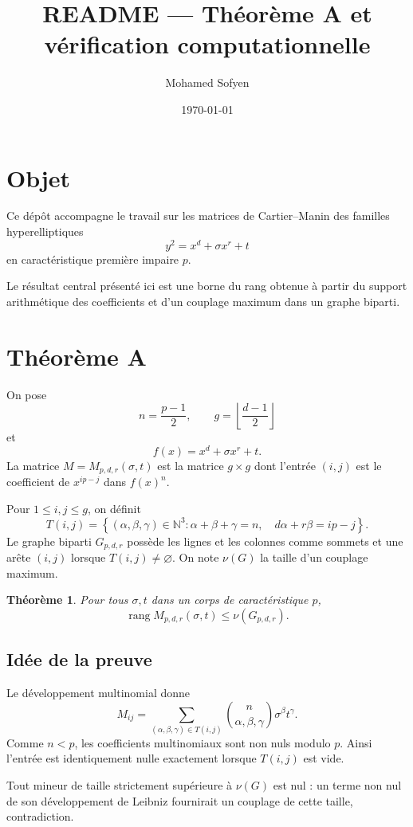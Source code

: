 \documentclass[11pt,a4paper]{article}
\title{README --- Théorème A et vérification computationnelle}
\author{Mohamed Sofyen}
\date{\today}
\newtheorem{theorem}{Théorème}
\begin{document}
\maketitle

\section{Objet}

Ce dépôt accompagne le travail sur les matrices de Cartier--Manin des
familles hyperelliptiques
\[
 y^2=x^d+\sigma x^r+t
\]
en caractéristique première impaire $p$.

Le résultat central présenté ici est une borne du rang obtenue à partir
du support arithmétique des coefficients et d'un couplage maximum dans
un graphe biparti.

\section{Théorème A}

On pose
\[
 n=\frac{p-1}{2},\qquad
 g=\left\lfloor\frac{d-1}{2}\right\rfloor
\]
et
\[
 f(x)=x^d+\sigma x^r+t.
\]
La matrice $M=M_{p,d,r}(\sigma,t)$ est la matrice $g\times g$ dont
l'entrée $(i,j)$ est le coefficient de $x^{ip-j}$ dans $f(x)^n$.

Pour $1\leq i,j\leq g$, on définit
\[
 T(i,j)=
 \left\{(\alpha,\beta,\gamma)\in\mathbb N^3:
 \alpha+\beta+\gamma=n,\quad
 d\alpha+r\beta=ip-j
 \right\}.
\]
Le graphe biparti $G_{p,d,r}$ possède les lignes et les colonnes comme
sommets et une arête $(i,j)$ lorsque $T(i,j)\neq\varnothing$.
On note $\nu(G)$ la taille d'un couplage maximum.

\begin{theorem}
Pour tous $\sigma,t$ dans un corps de caractéristique $p$,
\[
 \operatorname{rang}M_{p,d,r}(\sigma,t)
 \leq \nu(G_{p,d,r}).
\]
\end{theorem}

\subsection*{Idée de la preuve}

Le développement multinomial donne
\[
 M_{ij}
 =
 \sum_{(\alpha,\beta,\gamma)\in T(i,j)}
 {n\choose\alpha,\beta,\gamma}
 \sigma^\beta t^\gamma.
\]
Comme $n<p$, les coefficients multinomiaux sont non nuls modulo $p$.
Ainsi l'entrée est identiquement nulle exactement lorsque $T(i,j)$
est vide.

Tout mineur de taille strictement supérieure à $\nu(G)$ est nul :
un terme non nul de son développement de Leibniz fournirait un
couplage de cette taille, contradiction.
\end{document}

